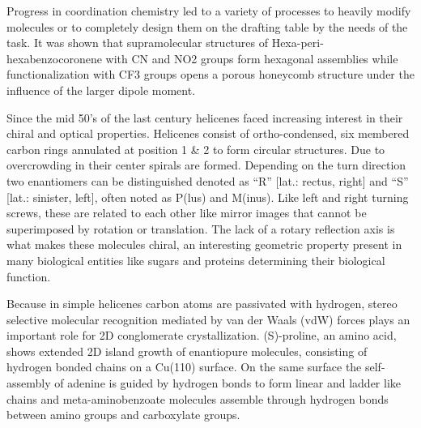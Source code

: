 Progress in coordination chemistry led to a variety of processes to heavily modify molecules or to completely design them on the drafting table by the needs of the task. It was shown that supramolecular structures of Hexa-peri-hexabenzocoronene with CN and NO2 groups form hexagonal assemblies while functionalization with CF3 groups opens a porous honeycomb structure under the influence of the larger dipole moment.\cite{Mu_Effect_2011}

Since the mid 50’s of the last century helicenes faced increasing interest in their chiral and optical properties.\cite{Newman_synthesis_1956, Rau_Exciplex_1992, Donckt_Flourescence_1968} Helicenes consist of ortho-condensed, six membered carbon rings annulated at position 1 \& 2 to form circular structures. Due to overcrowding in their center spirals are formed. Depending on the turn direction two enantiomers can be distinguished denoted as “R” [lat.: rectus, right] and “S” [lat.: sinister, left], often noted as P(lus) and M(inus). Like left and right turning screws, these are related to each other like mirror images that cannot be superimposed by rotation or translation. The lack of a rotary reflection axis is what makes these molecules chiral, an interesting geometric property present in many biological entities like sugars and proteins determining their biological function. 

Because in simple helicenes carbon atoms are passivated with hydrogen, stereo selective molecular recognition mediated by van der Waals (vdW) forces plays an important role for 2D conglomerate crystallization.\cite{Treier_aromatic_2008} (S)-proline, an amino acid, shows extended 2D island growth of enantiopure molecules, consisting of hydrogen bonded chains on a Cu(110) surface.\cite{Forster_Probing_2009} On the same surface the self-assembly of adenine is guided by hydrogen bonds to form linear and ladder like chains\cite{Cheng_Role_2016} and meta-aminobenzoate molecules assemble through hydrogen bonds between amino groups and carboxylate groups.\cite{Rabot_Self-assembly_2009}


